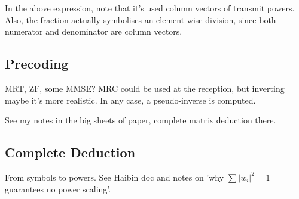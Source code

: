 In the above expression, note that it's used column vectors of transmit powers. Also, the fraction actually symbolises an element-wise division, since both numerator and denominator are column vectors.








\subsection{Precoding} \label{sec:precoding}
MRT, ZF, some MMSE?
MRC could be used at the reception, but inverting maybe it's more realistic. 
In any case, a pseudo-inverse is computed.



See my notes in the big sheets of paper, complete matrix deduction there.



\subsection{Complete Deduction} \label{sec:comp_deduction}
From symbols to powers. See Haibin doc and notes on 'why $\sum|w_i|^2 = 1$ guarantees no power scaling'.